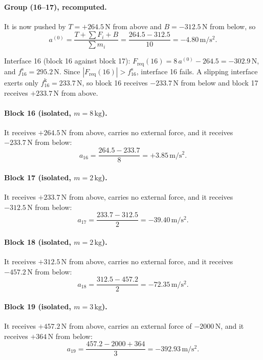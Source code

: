 \documentclass[11pt,a4paper]{article}
\begin{document}
\paragraph{Group (16--17), recomputed.} It is now pushed by $T=+264.5\,\mathrm{N}$ from above and $B=-312.5\,\mathrm{N}$ from below, so\[a^{(0)}=\dfrac{T+\sum F_i+B}{\sum m_i}=\dfrac{264.5 - 312.5}{10}=-4.80\,\mathrm{m/s^2}.\]

Interface 16 (block 16 against block 17): $F_{\mathrm{req}}(16)=8\,a^{(0)} - 264.5=-302.9\,\mathrm{N}$, and $f^{\mathrm s}_{16}=295.2\,\mathrm{N}$. Since $|F_{\mathrm{req}}(16)|>f^{\mathrm s}_{16}$, interface 16 fails. A slipping interface exerts only $f^{\mathrm k}_{16}=233.7\,\mathrm{N}$, so block 16 receives $-233.7\,\mathrm{N}$ from below and block 17 receives $+233.7\,\mathrm{N}$ from above.

\paragraph{Block 16 (isolated, $m=8\,\mathrm{kg}$).} It receives $+264.5\,\mathrm{N}$ from above, carries no external force, and it receives $-233.7\,\mathrm{N}$ from below:\[a_{16}=\dfrac{264.5 - 233.7}{8}=+3.85\,\mathrm{m/s^2}.\]

\paragraph{Block 17 (isolated, $m=2\,\mathrm{kg}$).} It receives $+233.7\,\mathrm{N}$ from above, carries no external force, and it receives $-312.5\,\mathrm{N}$ from below:\[a_{17}=\dfrac{233.7 - 312.5}{2}=-39.40\,\mathrm{m/s^2}.\]

\paragraph{Block 18 (isolated, $m=2\,\mathrm{kg}$).} It receives $+312.5\,\mathrm{N}$ from above, carries no external force, and it receives $-457.2\,\mathrm{N}$ from below:\[a_{18}=\dfrac{312.5 - 457.2}{2}=-72.35\,\mathrm{m/s^2}.\]

\paragraph{Block 19 (isolated, $m=3\,\mathrm{kg}$).} It receives $+457.2\,\mathrm{N}$ from above, carries an external force of $-2000\,\mathrm{N}$, and it receives $+364\,\mathrm{N}$ from below:\[a_{19}=\dfrac{457.2 - 2000 + 364}{3}=-392.93\,\mathrm{m/s^2}.\]
\end{document}
